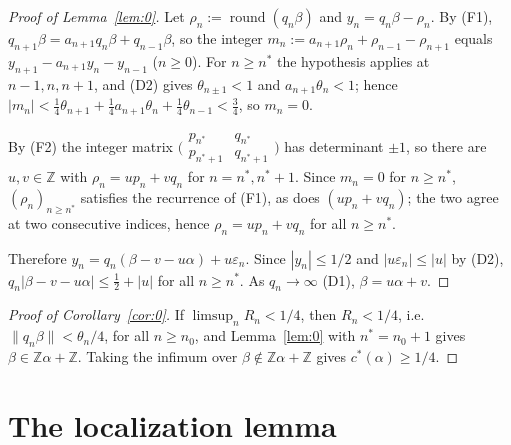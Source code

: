 \documentclass[11pt]{amsart}
\theoremstyle{definition}
\theoremstyle{remark}
\newcommand{\Z}{\mathbb{Z}}
\newcommand{\dist}[1]{\lVert #1\rVert}
\newcommand{\rnd}{\operatorname{round}}
\begin{document}
\begin{proof}[Proof of Lemma~\ref{lem:0}]
Let $\rho_n:=\rnd(q_n\beta)$ and $y_n=q_n\beta-\rho_n$. By (F1), $q_{n+1}\beta=a_{n+1}q_n\beta+q_{n-1}\beta$, so the
integer $m_n:=a_{n+1}\rho_n+\rho_{n-1}-\rho_{n+1}$ equals $y_{n+1}-a_{n+1}y_n-y_{n-1}$ ($n\ge0$). For $n\ge n^*$ the
hypothesis applies at $n-1,n,n+1$, and (D2) gives $\theta_{n\pm1}<1$ and $a_{n+1}\theta_n<1$; hence
$|m_n|<\tfrac14\theta_{n+1}+\tfrac14a_{n+1}\theta_n+\tfrac14\theta_{n-1}<\tfrac34$, so $m_n=0$.

By (F2) the integer matrix $\bigl(\begin{smallmatrix}p_{n^*}&q_{n^*}\\p_{n^*+1}&q_{n^*+1}\end{smallmatrix}\bigr)$ has
determinant $\pm1$, so there are $u,v\in\Z$ with $\rho_{n}=up_{n}+vq_{n}$ for $n=n^*,n^*+1$. Since $m_n=0$ for
$n\ge n^*$, $(\rho_n)_{n\ge n^*}$ satisfies the recurrence of (F1), as does $(up_n+vq_n)$; the two agree at two
consecutive indices, hence $\rho_n=up_n+vq_n$ for all $n\ge n^*$.

Therefore $y_n=q_n(\beta-v-u\alpha)+u\varepsilon_n$. Since $|y_n|\le1/2$ and $|u\varepsilon_n|\le|u|$ by (D2),
$q_n|\beta-v-u\alpha|\le\frac12+|u|$ for all $n\ge n^*$. As $q_n\to\infty$ (D1), $\beta=u\alpha+v$.
\end{proof}

\begin{proof}[Proof of Corollary~\ref{cor:0}]
If $\limsup_nR_n<1/4$, then $R_n<1/4$, i.e.\ $\dist{q_n\beta}<\theta_n/4$, for all $n\ge n_0$, and
Lemma~\ref{lem:0} with $n^*=n_0+1$ gives $\beta\in\Z\alpha+\Z$. Taking the infimum over $\beta\notin\Z\alpha+\Z$ gives
$c^*(\alpha)\ge1/4$.
\end{proof}

\section{The localization lemma}\label{sec:S1}
\end{document}
